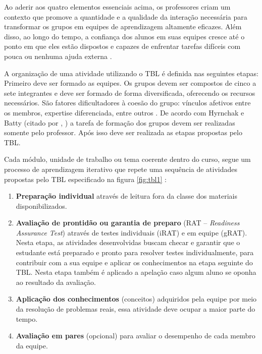 Ao aderir aos quatro elementos essenciais acima, os professores criam um contexto que promove a quantidade e a qualidade da interação necessária para transformar os grupos em equipes de aprendizagem altamente eficazes. Além disso, ao longo do tempo, a confiança dos alunos em suas equipes cresce até o ponto em que eles estão dispostos e capazes de enfrentar tarefas difíceis com pouca ou nenhuma ajuda externa \cite{sweet}.

A organização de uma atividade utilizando o TBL é definida nas seguintes etapas: Primeiro deve ser formado as equipes.  Os grupos devem ser compostos de cinco a sete integrantes e deve ser formado de forma diversificada, oferecendo os recursos necessários. São fatores dificultadores à coesão do grupo: vínculos afetivos entre os membros, expertise diferenciada, entre outros \cite{bollela}. De acordo com Hyrnchak e Batty (citado por \citeauthor{bollela}, \citeyear{bollela}) a tarefa de formação dos grupos devem ser realizadas somente pelo professor. Após isso deve ser realizada as etapas propostas pelo TBL.

Cada módulo, unidade de trabalho ou tema coerente dentro do curso, segue um processo de aprendizagem iterativo que repete uma sequência de atividades propostas pelo TBL especificado na figura \ref{fig:tbl1} \cite{bollela}:

\begin{enumerate}
  \item \textbf{Preparação individual} através de leitura fora da classe dos materiais disponibilizados.
  \item \textbf{Avaliação de prontidão ou garantia de preparo} (RAT – \textit{Readiness Assurance Test}) através de testes individuais  (iRAT) e em equipe (gRAT). Nesta etapa, as atividades desenvolvidas buscam checar e garantir que o estudante está preparado e pronto para resolver testes individualmente, para contribuir com a sua equipe e aplicar os conhecimentos na etapa seguinte do TBL. Nesta etapa também é aplicado a apelação caso algum aluno se oponha ao resultado da avaliação.
  \item \textbf{Aplicação dos conhecimentos} (conceitos) adquiridos pela equipe por meio da resolução de problemas reais, essa atividade deve ocupar a maior parte do tempo.
  \item \textbf{Avaliação em pares} (opcional) para avaliar o desempenho de cada membro da equipe.
\end{enumerate}

